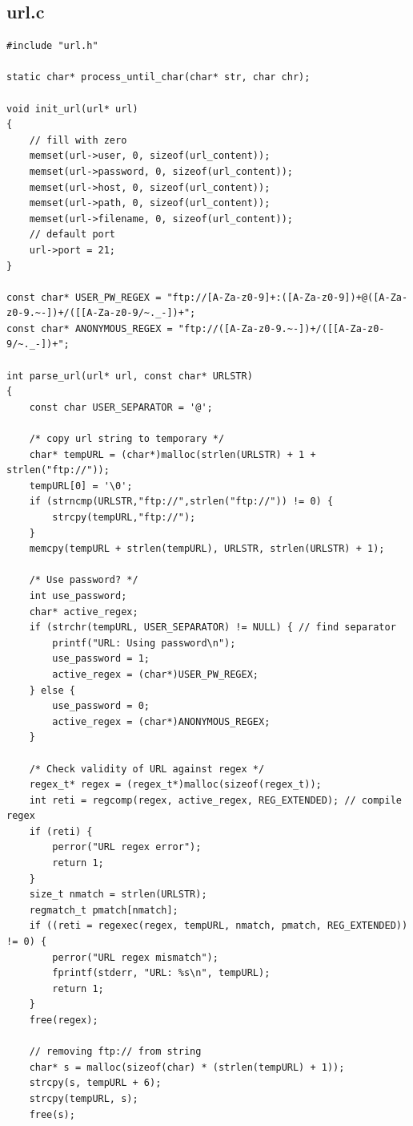 \documentclass[a4paper,11pt,titlepage]{article}
\begin{document}
\subsection*{url.c}
\begin{lstlisting}[style=customcwithlines]
#include "url.h"

static char* process_until_char(char* str, char chr);

void init_url(url* url)
{
    // fill with zero
    memset(url->user, 0, sizeof(url_content));
    memset(url->password, 0, sizeof(url_content));
    memset(url->host, 0, sizeof(url_content));
    memset(url->path, 0, sizeof(url_content));
    memset(url->filename, 0, sizeof(url_content));
    // default port
    url->port = 21;
}

const char* USER_PW_REGEX = "ftp://[A-Za-z0-9]+:([A-Za-z0-9])+@([A-Za-z0-9.~-])+/([[A-Za-z0-9/~._-])+";
const char* ANONYMOUS_REGEX = "ftp://([A-Za-z0-9.~-])+/([[A-Za-z0-9/~._-])+";

int parse_url(url* url, const char* URLSTR)
{
    const char USER_SEPARATOR = '@';

    /* copy url string to temporary */
    char* tempURL = (char*)malloc(strlen(URLSTR) + 1 + strlen("ftp://"));
    tempURL[0] = '\0';
    if (strncmp(URLSTR,"ftp://",strlen("ftp://")) != 0) {
        strcpy(tempURL,"ftp://");
    }
    memcpy(tempURL + strlen(tempURL), URLSTR, strlen(URLSTR) + 1);

    /* Use password? */
    int use_password;
    char* active_regex;
    if (strchr(tempURL, USER_SEPARATOR) != NULL) { // find separator
        printf("URL: Using password\n");
        use_password = 1;
        active_regex = (char*)USER_PW_REGEX;
    } else {
        use_password = 0;
        active_regex = (char*)ANONYMOUS_REGEX;
    }

    /* Check validity of URL against regex */
    regex_t* regex = (regex_t*)malloc(sizeof(regex_t));
    int reti = regcomp(regex, active_regex, REG_EXTENDED); // compile regex
    if (reti) {
        perror("URL regex error");
        return 1;
    }
    size_t nmatch = strlen(URLSTR);
    regmatch_t pmatch[nmatch];
    if ((reti = regexec(regex, tempURL, nmatch, pmatch, REG_EXTENDED)) != 0) {
        perror("URL regex mismatch");
        fprintf(stderr, "URL: %s\n", tempURL);
        return 1;
    }
    free(regex);

    // removing ftp:// from string
    char* s = malloc(sizeof(char) * (strlen(tempURL) + 1));
    strcpy(s, tempURL + 6);
    strcpy(tempURL, s);
    free(s);


\end{lstlisting}
\end{document}
